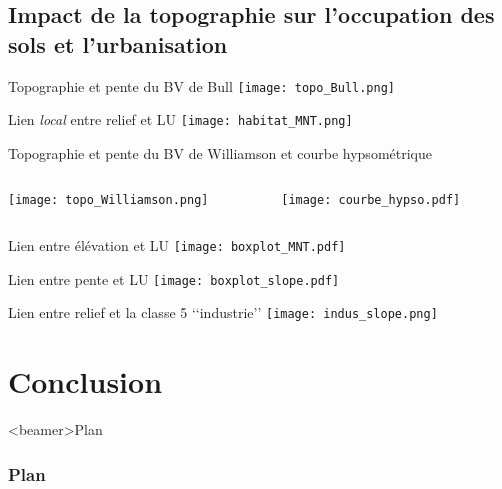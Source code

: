 \documentclass[aspectratio=169]{beamer}
\begin{document}
\subsection{Impact de la topographie sur l\rq{}occupation des sols et l\rq{}urbanisation}

\begin{frame}{Topographie et pente du BV de Bull}
\texttt{[image: topo\_Bull.png]}
\end{frame}

\begin{frame}{Lien \emph{local} entre relief et LU}
\texttt{[image: habitat\_MNT.png]}
\end{frame}

\begin{frame}{Topographie et pente du BV de Williamson et courbe hypsométrique}
\begin{columns}
	\begin{column}{0.65\textwidth}
	\texttt{[image: topo\_Williamson.png]}
	\end{column}
	\begin{column}{0.35\textwidth}
	\texttt{[image: courbe\_hypso.pdf]}
	\end{column}
\end{columns}
\end{frame}

\begin{frame}{Lien entre élévation et LU}
\texttt{[image: boxplot\_MNT.pdf]}
\end{frame}

\begin{frame}{Lien entre pente et LU}
\texttt{[image: boxplot\_slope.pdf]}
\end{frame}

\begin{frame}{Lien entre relief et la classe 5 \lq\lq{}industrie\rq\rq{}}
\texttt{[image: indus\_slope.png]}
\end{frame}


\section{Conclusion}

\begin{frame}<beamer>{Plan}
\frametitle{Plan}
\tableofcontents[currentsection]
\end{frame}
\end{document}
